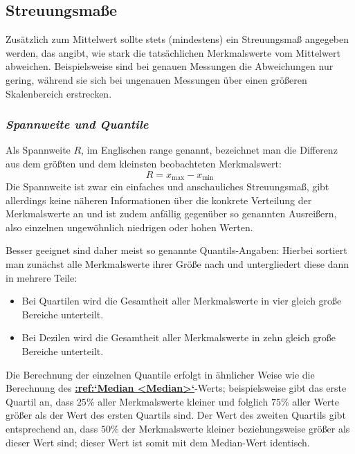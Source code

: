 \documentclass[a4paper]{article}
\providecommand*{\DUrubric}[2][class-arg]{%
  \subsubsection*{\centering\textit{\textmd{#2}}}}
\begin{document}


\subsection{Streuungsmaße%
  \label{id7}%
  \label{streuungsmasze}%
}

Zusätzlich zum Mittelwert sollte stets (mindestens) ein Streuungsmaß angegeben
werden, das angibt, wie stark die tatsächlichen Merkmalswerte vom Mittelwert
abweichen. Beispielsweise sind bei \textquotedbl{}genauen\textquotedbl{} Messungen die Abweichungen nur
gering, während sie sich bei \textquotedbl{}ungenauen\textquotedbl{} Messungen über einen größeren
Skalenbereich erstrecken.

\DUrubric{Spannweite und Quantile}

Als Spannweite $R$, im Englischen \textquotedbl{}range\textquotedbl{} genannt, bezeichnet man die
Differenz aus dem größten und dem kleinsten beobachteten Merkmalswert:
%
\begin{equation*}
R = x_{\mathrm{max}} - x_{\mathrm{min}}
\end{equation*}
Die Spannweite ist zwar ein einfaches und anschauliches Streuungsmaß, gibt
allerdings keine näheren Informationen über die konkrete Verteilung der
Merkmalswerte an und ist zudem anfällig gegenüber so genannten \textquotedbl{}Ausreißern\textquotedbl{},
also einzelnen ungewöhnlich niedrigen oder hohen Werten.

Besser geeignet sind daher meist so genannte Quantils-Angaben: Hierbei sortiert
man zunächst alle Merkmalswerte ihrer Größe nach und untergliedert diese dann in
mehrere Teile:
%
\begin{itemize}

\item Bei Quartilen wird die Gesamtheit aller Merkmalswerte in vier gleich große
Bereiche unterteilt.

\item Bei Dezilen wird die Gesamtheit aller Merkmalswerte in zehn gleich große
Bereiche unterteilt.

\end{itemize}

Die Berechnung der einzelnen Quantile erfolgt in ähnlicher Weise wie die
Berechnung des %
\hyperlink{id8}{\textbf{\color{red}:ref:`Median <Median>`}}-Werts; beispielsweise gibt das erste
Quartil an, dass $25\%$ aller Merkmalswerte kleiner und folglich
$75\%$ aller Werte größer als der Wert des ersten Quartils sind. Der Wert
des zweiten Quartils gibt entsprechend an, dass $50\%$ der Merkmalswerte
kleiner beziehungsweise größer als dieser Wert sind; dieser Wert ist somit mit
dem Median-Wert identisch.
\end{document}
